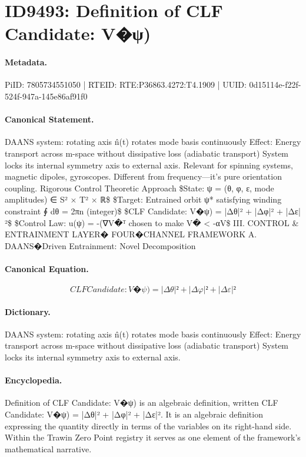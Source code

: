 \section*{ID9493: Definition of CLF Candidate: V�ψ)}
\paragraph{Metadata.}
PiID: 7805734551050 | RTEID: RTE:P36863.4272:T4.1909 | UUID: 0d15114e-f22f-524f-947a-145e86af91f0

\paragraph{Canonical Statement.}
DAANS system: rotating axis n̂(t) rotates mode basis continuously Effect: Energy transport across m-space without dissipative loss (adiabatic transport) System locks its internal symmetry axis to external axis. Relevant for spinning systems, magnetic dipoles, gyroscopes. Different from frequency—it's pure orientation coupling. Rigorous Control Theoretic Approach \$State: ψ = (θ, φ, ε, mode amplitudes) ∈ S² × T² × ℝ\$ \$Target: Entrained orbit ψ* satisfying winding constraint ∮ dθ = 2πn (integer)\$ \$CLF Candidate: V�ψ) = |Δθ|² + |Δφ|² + |Δε|²\$ \$Control Law: u(ψ) = -(∇V�ᵀ chosen to make V� < -αV\$ III. CONTROL \& ENTRAINMENT LAYER� FOUR�CHANNEL FRAMEWORK A. DAANS�Driven Entrainment: Novel Decomposition

\paragraph{Canonical Equation.}
\[
CLF Candidate: V�ψ) = |Δθ|² + |Δφ|² + |Δε|²
\]

\paragraph{Dictionary.}
DAANS system: rotating axis n̂(t) rotates mode basis continuously Effect: Energy transport across m-space without dissipative loss (adiabatic transport) System locks its internal symmetry axis to external axis.

\paragraph{Encyclopedia.}
Definition of CLF Candidate: V�ψ) is an algebraic definition, written CLF Candidate: V�ψ) = |Δθ|² + |Δφ|² + |Δε|². It is an algebraic definition expressing the quantity directly in terms of the variables on its right-hand side. Within the Trawin Zero Point registry it serves as one element of the framework's mathematical narrative.
